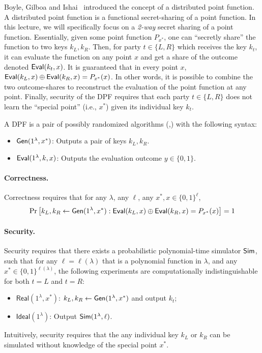 Boyle, Gilboa and Ishai~\cite{boyle2016function} introduced the concept of a distributed point function. 
A distributed point function
is a functional secret-sharing of a point function.
In this lecture, 
we will specifically focus on a {\it 2-way} secret sharing of a point function.
Essentially, given some point function $P_{x^*}$, 
one can ``secretly share'' the function to two keys $k_L,k_R$. 
Then, for party $t \in \{L, R\}$ which
receives the key $k_t$, 
it can evaluate the function on any point $x$ and 
get a share of the outcome denoted ${\sf Eval}(k_t, x)$. 
It is guaranteed that in every point $x$, 
${\sf Eval}(k_L, x)\oplus{\sf Eval}(k_R, x)=P_{x^*}(x)$.
In other words, it is possible to combine
the two outcome-shares to reconstruct the  
evaluation of the point function at any point. 
Finally, security of the DPF requires that  
each party $t \in \{L, R\}$ does not learn  
the ``special point'' (i.e., $x^*$) given its individual key $k_t$.


\begin{definition}
    A DPF is a pair of possibly randomized 
algorithms (\Gen,\Eval) with the following syntax:
    \hfill
    \begin{itemize}
        \item ${\sf Gen}(1^\lambda,x^*)$: Outputs a pair of keys $k_L,k_R$.
        \item ${\sf Eval}(1^\lambda, k,x)$: Outputs the evaluation outcome $y \in \{0,1\}$.
    \end{itemize}
    \paragraph{Correctness.} 
Correctness requires that for any $\lambda$, 
any $\ell$, 
any $x^*, x \in \{0, 1\}^{\ell}$, 
\[
\Pr\left[k_L,k_R \leftarrow {\sf Gen}(1^\lambda, x^*):{\sf Eval}(k_L,x) \oplus {\sf Eval}(k_R,x) = P_{x^*}(x)\right] = 1
\]


\paragraph{Security.} 
Security requires that 
there exists a probabilistic polynomial-time simulator ${\sf Sim}$, 
such that 
for any $\ell = \ell(\lambda)$ that is a polynomial function in $\lambda$, 
and any $x^*\in \{0,1\}^{\ell(\lambda)}$, 
the following experiments are computationally indistinguishable
for both $t  = L$ and $t = R$: 
    \begin{itemize}
        \item $\mathsf{Real}(1^\lambda, x^*)$: $k_L,k_R\leftarrow  {\sf Gen}(1^\lambda, x^*)$ and output $k_t$;
        \item $\mathsf{Ideal}(1^\lambda)$: Output ${\sf Sim}(1^\lambda, \ell)$.
    \end{itemize}
\end{definition}
Intuitively, security requires that the any individual 
key $k_L$ or $k_R$ 
can be simulated without knowledge
of the special point $x^*$.

